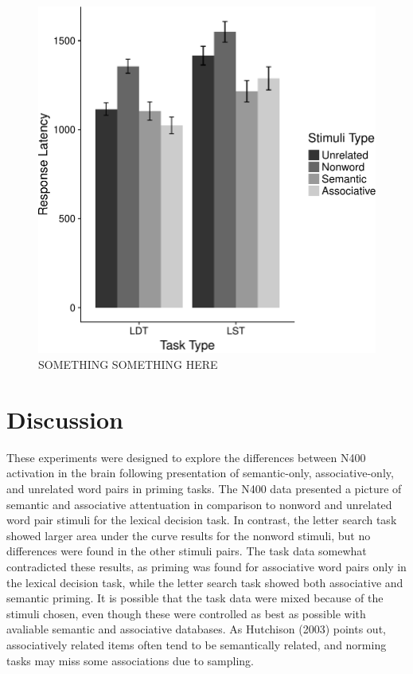 \documentclass[english,man]{apa6}
\theoremstyle{definition}
\theoremstyle{definition}
\theoremstyle{definition}
\theoremstyle{remark}
\begin{document}
\begin{figure}
\centering
\includegraphics{BrainPaper_files/figure-latex/RT-graph-1.pdf}
\caption{\label{fig:RT-graph}SOMETHING SOMETHING HERE}
\end{figure}

\section{Discussion}\label{discussion}

These experiments were designed to explore the differences between N400
activation in the brain following presentation of semantic-only,
associative-only, and unrelated word pairs in priming tasks. The N400
data presented a picture of semantic and associative attentuation in
comparison to nonword and unrelated word pair stimuli for the lexical
decision task. In contrast, the letter search task showed larger area
under the curve results for the nonword stimuli, but no differences were
found in the other stimuli pairs. The task data somewhat contradicted
these results, as priming was found for associative word pairs only in
the lexical decision task, while the letter search task showed both
associative and semantic priming. It is possible that the task data were
mixed because of the stimuli chosen, even though these were controlled
as best as possible with avaliable semantic and associative databases.
As Hutchison (2003) points out, associatively related items often tend
to be semantically related, and norming tasks may miss some associations
due to sampling.
\end{document}
